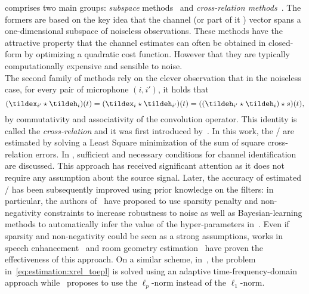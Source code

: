  comprises two main groups: \textit{subspace} methods~ and \textit{cross-relation methods}~.
The formers are based on the key idea that the channel (or part of it ) vector spans a one-dimensional subspace of noiseless observations.
These methods have the attractive property that the channel estimates can often be obtained in closed-form by optimizing a quadratic cost function.
However that they are typically computationally expensive and sensible to noise.
\\The second family of methods rely on the clever observation that in the noiseless case, for every pair of microphone $(i, i')$, it holds that
\begin{equation}\label{eq:estimation:xrel_toepl}
    (\tildex_{i'} \convCont \tildeh_i)(t) = (\tildex_{i} \convCont \tildeh_{i'})(t) =  ((\tildeh_{i'} \convCont \tildeh_i) \convCont s)(t)
    ,
\end{equation}
by commutativity and associativity of the convolution operator.
This identity is called the \textit{cross-relation} and it was first introduced by~.
In this work, the \RIR/ are estimated by solving a Least Square minimization of the sum of square cross-relation errors.
In , sufficient and necessary conditions for channel identification are discussed.
This approach has received significant attention as it does not require any assumption about the source signal.
Later, the accuracy of estimated \RIRs/ has been subsequently improved using prior knowledge on the filters:
in particular, the authors of~ have proposed to use sparsity penalty and non-negativity constraints to increase robustness to noise as well as Bayesian-learning methods to automatically infer the value of the hyper-parameters in~.
Even if sparsity and non-negativity could be seen as a strong assumptions, works in speech enhancement~ and room geometry estimation~ have proven the effectiveness of this approach.
On a similar scheme, in~, the problem in~\cref{eq:estimation:xrel_toepl} is solved using an adaptive time-frequency-domain approach while~ proposes to use the $\ell_p$-norm instead of the $\ell_1$-norm.
